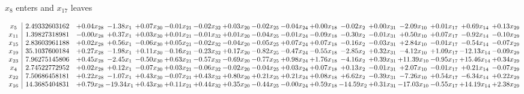 \documentclass[9pt]{article}
\begin{document}
 $ x_{8} $ enters and $ x_{17} $ leaves 

 \[\begin{array}{c| c c@{\hskip 2pt} c@{\hskip 2pt} c@{\hskip 2pt} c@{\hskip 2pt} c@{\hskip 2pt} c@{\hskip 2pt} c@{\hskip 2pt} c@{\hskip 2pt} c@{\hskip 2pt} c@{\hskip 2pt} c@{\hskip 2pt} c@{\hskip 2pt} c@{\hskip 2pt} c@{\hskip 2pt} c@{\hskip 2pt} }
 x_{5}   &  2.49332603162 & +  0.04 x_{28} & -1.38 x_{1} & +  0.07 x_{30} & -0.01 x_{21} & -0.02 x_{32} & +  0.03 x_{20} & -0.02 x_{25} & -0.04 x_{24} & +  0.00 x_{18} & -0.02 x_{2} & +  0.00 x_{31} & -2.09 x_{10} & +  0.01 x_{17} & +  0.69 x_{14} & +  0.13 x_{29}\\
 x_{11}   &  1.39827318981 & -0.00 x_{28} & +  0.37 x_{1} & +  0.03 x_{30} & +  0.01 x_{21} & -0.01 x_{32} & +  0.01 x_{20} & -0.04 x_{25} & -0.01 x_{24} & -0.09 x_{18} & -0.30 x_{2} & -0.01 x_{31} & +  0.50 x_{10} & +  0.07 x_{17} & -0.92 x_{14} & -0.10 x_{29}\\
 x_{15}   &  2.83603961188 & +  0.02 x_{28} & +  0.56 x_{1} & -0.06 x_{30} & +  0.05 x_{21} & -0.02 x_{32} & -0.04 x_{20} & -0.05 x_{25} & +  0.07 x_{24} & +  0.07 x_{18} & -0.16 x_{2} & -0.03 x_{31} & +  2.84 x_{10} & -0.01 x_{17} & -0.54 x_{14} & -0.07 x_{29}\\
 x_{19}   &  35.1037600184 & +  0.27 x_{28} & -1.98 x_{1} & +  0.11 x_{30} & -0.16 x_{21} & -0.23 x_{32} & +  0.17 x_{20} & -0.82 x_{25} & -0.47 x_{24} & -0.55 x_{18} & -2.85 x_{2} & +  0.32 x_{31} & -4.12 x_{10} & +  1.09 x_{17} & -12.13 x_{14} & -0.09 x_{29}\\
 x_{23}   &  7.96275145806 & +  0.45 x_{28} & -2.45 x_{1} & -0.50 x_{30} & +  0.63 x_{21} & -0.57 x_{32} & -0.69 x_{20} & -0.77 x_{25} & +  0.98 x_{24} & +  1.76 x_{18} & -4.16 x_{2} & +  0.39 x_{31} & + 11.39 x_{10} & -0.95 x_{17} & + 15.46 x_{14} & +  0.34 x_{29}\\
 x_{4}   &  2.74522772952 & +  0.02 x_{28} & +  0.12 x_{1} & -0.07 x_{30} & +  0.03 x_{21} & -0.06 x_{32} & -0.02 x_{20} & -0.04 x_{25} & +  0.03 x_{24} & +  0.07 x_{18} & +  0.13 x_{2} & -0.01 x_{31} & +  2.07 x_{10} & -0.01 x_{17} & +  0.21 x_{14} & -0.07 x_{29}\\
 x_{22}   &  7.50686458181 & +  0.22 x_{28} & -1.07 x_{1} & +  0.43 x_{30} & -0.07 x_{21} & +  0.43 x_{32} & +  0.80 x_{20} & +  0.21 x_{25} & +  0.21 x_{24} & +  0.08 x_{18} & +  6.62 x_{2} & -0.39 x_{31} & -7.26 x_{10} & +  0.54 x_{17} & -6.34 x_{14} & +  0.22 x_{29}\\
 x_{16}   &  14.3685404831 & +  0.79 x_{28} & -19.34 x_{1} & +  0.43 x_{30} & +  0.11 x_{21} & +  0.44 x_{32} & +  0.35 x_{20} & -0.44 x_{25} & -0.00 x_{24} & +  0.59 x_{18} & -14.59 x_{2} & +  0.31 x_{31} & -17.03 x_{10} & -0.55 x_{17} & + 14.19 x_{14} & +  2.38 x_{29}\\

\end{array}\]
\end{document}
